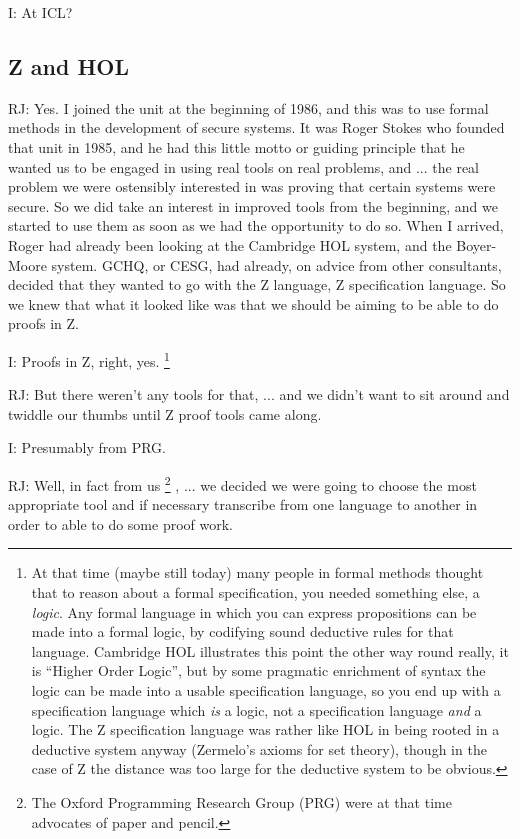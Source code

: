 \documentclass[10pt,titlepage]{book}
\begin{document}
I: At ICL?

\subsection{Z and HOL}

RJ: Yes.
I joined the unit at the beginning of 1986, and this was to use formal methods in the development of secure systems.
It was Roger Stokes who founded that unit in 1985, and he had this little motto or guiding principle that he wanted us to be engaged in using real tools on real problems, and ... the real problem we were ostensibly interested in was proving that certain systems were secure.
So we did take an interest in improved tools from the beginning, and we started to use them as soon as we had the opportunity to do so.
When I arrived, Roger had already been looking at the Cambridge HOL system, and the Boyer-Moore system.
GCHQ, or CESG, had already, on advice from other consultants, decided that they wanted to go with the Z language, Z specification language.
So we knew that what it looked like was that we should be aiming to be able to do proofs in Z.

I: Proofs in Z, right, yes.
\footnote{
At that time (maybe still today) many people in formal methods thought that to reason about a formal specification, you needed something else, a {\it logic}.
Any formal language in which you can express propositions can be made into a formal logic, by codifying sound deductive rules for that language.
Cambridge HOL illustrates this point the other way round really, it is ``Higher Order Logic'', but by some pragmatic enrichment of syntax the logic can be made into a usable specification language, so you end up with a specification language which {\it is} a logic, not a specification language {\it and} a logic.
The Z specification language was rather like HOL in being rooted in a deductive system anyway (Zermelo's axioms for set theory), though in the case of Z the distance was too large for the deductive system to be obvious.
}

RJ: But there weren't any tools for that, ... and we didn't want to sit around and twiddle our thumbs until Z proof tools came along.

I: Presumably from PRG.

RJ: Well, in fact from us%
\footnote{The Oxford Programming Research Group (PRG) were at that time advocates of paper and pencil.}%
, ... we decided we were going to choose the most appropriate tool and if necessary transcribe from one language to another in order to able to do some proof work.
\end{document}

